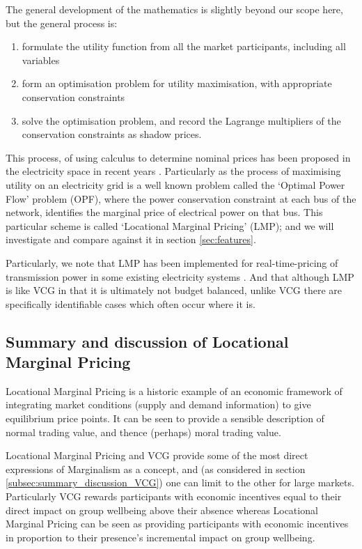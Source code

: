 The general development of the mathematics is slightly beyond our scope here, but the general process is:
\begin{enumerate}
\item formulate the utility function from all the market participants, including all variables
\item form an optimisation problem for utility maximisation, with appropriate conservation constraints
\item solve the optimisation problem, and record the Lagrange multipliers of the conservation constraints as shadow prices.
\end{enumerate}
This process, of using calculus to determine nominal prices has been proposed in the electricity space in recent years \cite{lmp1, lmp2, lmp4, game3}.
Particularly as the process of maximising utility on an electricity grid is a well known problem called the `Optimal Power Flow' problem (OPF), where the power conservation constraint at each bus of the network, identifies the marginal price of electrical power on that bus.
This particular scheme is called `Locational Marginal Pricing' (LMP); and we will investigate and compare against it in section \ref{sec:features}.

Particularly, we note that LMP has been implemented for real-time-pricing of transmission power in some existing electricity systems \cite{WANG2015695,zonal}.
And that although LMP is like VCG in that it is ultimately not budget balanced, unlike VCG there are specifically identifiable cases which often occur where it is.\cite{lmp2}


\subsection{Summary and discussion of Locational Marginal Pricing}

Locational Marginal Pricing is a historic example of an economic framework of integrating market conditions (supply and demand information) to give equilibrium price points.
It can be seen to provide a sensible description of normal trading value, and thence (perhaps) moral trading value.

Locational Marginal Pricing and VCG provide some of the most direct expressions of Marginalism as a concept, and (as considered in section \ref{subsec:summary_discussion_VCG}) one can limit to the other for large markets.
Particularly VCG rewards participants with economic incentives equal to their direct impact on group wellbeing above their absence whereas Locational Marginal Pricing can be seen as providing participants with economic incentives in proportion to their presence's incremental impact on group wellbeing.

